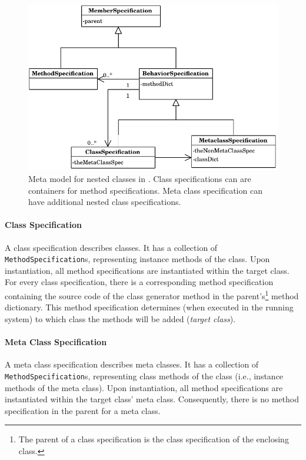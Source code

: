 \begin{figure}[!htp]
	\centering
	\includegraphics[scale=0.75]{metamodel.pdf}
	\caption[Meta model in \msname]{Meta model for nested classes in \msname. Class specifications can are containers for method specifications. Meta class specification can have additional nested class specifications.}
	\label{fig:impl_meta_model}
\end{figure}

\paragraph{Class Specification}
A class specification describes classes. It has a collection of \texttt{MethodSpecification}s, representing instance methods of the class. Upon instantiation, all method specifications are instantiated within the target class. For every class specification, there is a corresponding method specification containing the source code of the class generator method in the parent's\footnote{The parent of a class specification is the class specification of the enclosing class.} method dictionary. This method specification determines (when executed in the running system) to which class the methods will be added (\emph{target class}).

\paragraph{Meta Class Specification}
A meta class specification describes meta classes. It has a collection of \texttt{MethodSpecification}s, representing class methods of the class (i.e., instance methods of the meta class). Upon instantiation, all method specifications are instantiated within the target class' meta class. Consequently, there is no method specification in the parent for a meta class.

